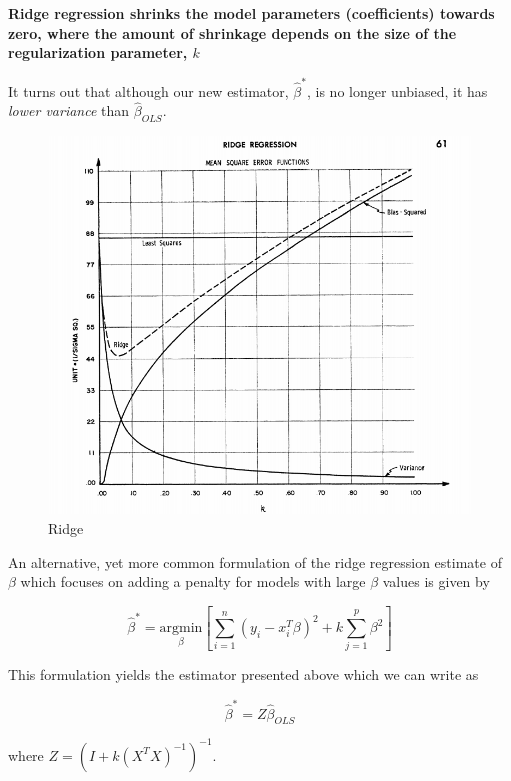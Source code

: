\textbf{Ridge regression shrinks the model parameters (coefficients) towards zero, where the amount of shrinkage depends on the size of the regularization parameter, $k$}




It turns out that although our new estimator, $\hat{\beta}^*$, is no longer unbiased, it has \textit{lower variance} than $\hat{\beta}_{OLS}$.


\begin{figure}[H]
\begin{center}
\includegraphics[scale=0.3]{ridge.png}
\end{center}
\caption{Ridge}
\label{fig:ridge}
\end{figure}




An alternative, yet more common formulation of the ridge regression estimate of $\beta$ which focuses on adding a penalty for models with large $\beta$ values is given by

$$\hat{\beta}^* = \underset{\beta}{\text{argmin}}\left[ \sum_{i=1}^n (y_i - x_i^T \beta)^2 + k \sum_{j = 1}^p \beta^2\right]$$



This formulation yields the estimator presented above which we can write as

$$\hat{\beta}^* = Z \hat{\beta}_{OLS}$$

where $Z = (I + k(X^TX)^{-1})^{-1}$.

